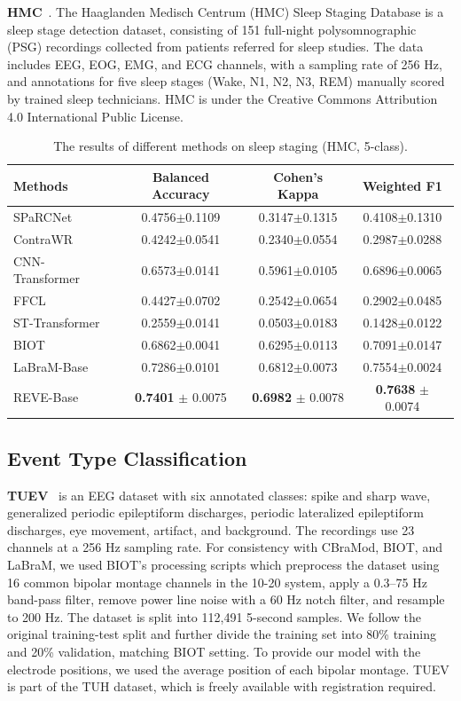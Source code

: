 \documentclass{article}
\begin{document}
\textbf{HMC}~\citep{alvarez2021inter}. The Haaglanden Medisch Centrum (HMC) Sleep Staging Database is a sleep stage detection dataset, consisting of 151 full-night polysomnographic (PSG) recordings collected from patients referred for sleep studies. The data includes EEG, EOG, EMG, and ECG channels, with a sampling rate of 256 Hz, and annotations for five sleep stages (Wake, N1, N2, N3, REM) manually scored by trained sleep technicians.  HMC is under the Creative Commons Attribution 4.0 International Public License.


\begin{table}[H]
\centering
\small
\caption{The results of different methods on sleep staging (HMC, 5-class).}
\begin{tabular}{lccc}
\toprule
\textbf{Methods} & \textbf{Balanced Accuracy} & \textbf{Cohen's Kappa} & \textbf{Weighted F1} \\
\midrule
SPaRCNet         & 0.4756$\pm$0.1109 & 0.3147$\pm$0.1315 & 0.4108$\pm$0.1310 \\
ContraWR         & 0.4242$\pm$0.0541 & 0.2340$\pm$0.0554 & 0.2987$\pm$0.0288 \\
CNN-Transformer  & 0.6573$\pm$0.0141 & 0.5961$\pm$0.0105 & 0.6896$\pm$0.0065 \\
FFCL             & 0.4427$\pm$0.0702 & 0.2542$\pm$0.0654 & 0.2902$\pm$0.0485 \\
ST-Transformer   & 0.2559$\pm$0.0141 & 0.0503$\pm$0.0183 & 0.1428$\pm$0.0122 \\
\midrule
BIOT             & 0.6862$\pm$0.0041 & 0.6295$\pm$0.0113 & 0.7091$\pm$0.0147 \\
LaBraM-Base      & 0.7286$\pm$0.0101 & 0.6812$\pm$0.0073 & 0.7554$\pm$0.0024 \\
\midrule
REVE-Base        & \textbf{0.7401} $\pm$ 0.0075 & \textbf{0.6982} $\pm$ 0.0078 & \textbf{0.7638} $\pm$ 0.0074 \\
\bottomrule
\end{tabular}
\label{tab:hmc}
\end{table}


\subsection{Event Type Classification}

\textbf{TUEV}~\citep{obeid2016temple} is an EEG dataset with six annotated classes: spike and sharp wave, generalized periodic epileptiform discharges, periodic lateralized epileptiform discharges, eye movement, artifact, and background. The recordings use 23 channels at a 256 Hz sampling rate. For consistency with CBraMod, BIOT, and LaBraM, we used BIOT's processing scripts which preprocess the dataset using 16 common bipolar montage channels in the 10-20 system, apply a 0.3–75 Hz band-pass filter, remove power line noise with a 60 Hz notch filter, and resample to 200 Hz. The dataset is split into 112,491 5-second samples. We follow the original training-test split and further divide the training set into 80\% training and 20\% validation, matching BIOT setting. To provide our model with the electrode positions, we used the average position of each bipolar montage. TUEV is part of the TUH dataset, which is freely available with registration required.
\end{document}
